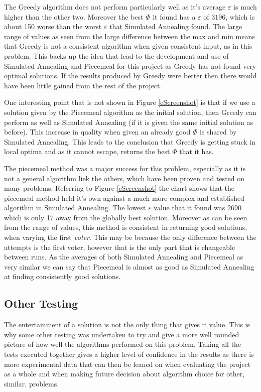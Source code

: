 \documentclass[12pt]{report}
\begin{document}
The Greedy algorithm does not perform particularly well as it's average $\varepsilon$ is much higher than the other two. Moreover the best $\Phi$ it found has a $\varepsilon$ of $3196$, which is about 150 worse than the worst $\varepsilon$ that Simulated Annealing found. The large range of values as seen from the large difference between the max and min means that Greedy is not a consistent algorithm when given consistent input, as in this problem. This backs up the idea that lead to the development and use of Simulated Annealing and Piecemeal for this project as Greedy has not found very optimal solutions. If the results produced by Greedy were better then there would have been little gained from the rest of the project. 

One interesting point that is not shown in Figure \ref{eScreenshot} is that if we use a solution given by the Piecemeal algorithm as the initial solution, then Greedy can perform as well as Simulated Annealing (if it is given the same initial solution as before). This increase in quality when given an already good $\Phi$ is shared by Simulated Annealing. This leads to the conclusion that Greedy is getting stuck in local optima and as it cannot escape, returns the best $\Phi$ that it has.

The piecemeal method was a major success for this problem, especially as it is not a general algorithm liek the others, which have been proven and tested on many problems. Referring to Figure \ref{eScreenshot} the chart shows that the piecemeal method held it's own against a much more complex and established algorithm in Simulated Annealing. The lowest $\varepsilon$ value that it found was $2690$ which is only 17 away from the globally best solution. Moreover as can be seen from the range of values, this method is consistent in returning good solutions, when varying the first \textit{voter}. This may be because the only difference between the attempts is the first voter, however that is the only part that is changeable between runs. As the averages of both Simulated Annealing and Piecemeal as very similar we can say that Piecemeal is almost as good as Simulated Annealing at finding consistently good solutions.


\subsection{Other Testing}\label{OtherTesting}
The entertainment of a solution is not the only thing that gives it value. This is why some other testing was undertaken to try and give a more well rounded picture of how well the algorithms performed on this problem. Taking all the tests executed together gives a higher level of confidence in the results as there is more experimental data that can then be leaned on when evaluating the project as a whole and when making future decision about algorithm choice for other, similar, problems.
\end{document}
